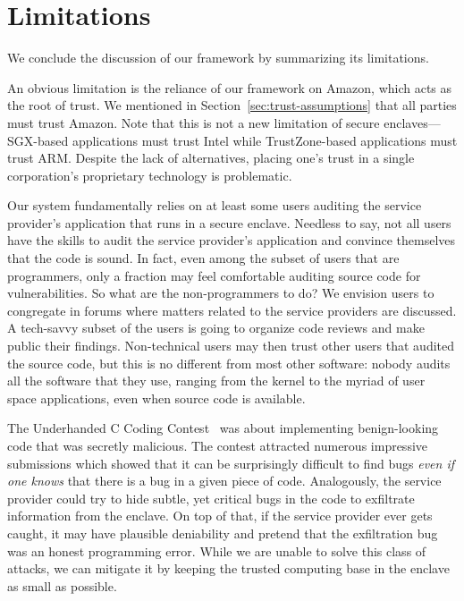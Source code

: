 \section{Limitations}
\label{sec:limitations}

We conclude the discussion of our framework by summarizing its limitations.

An obvious limitation is the reliance of our framework on Amazon, which acts as the root of trust.  We mentioned in Section~\ref{sec:trust-assumptions} that all parties must trust Amazon.  Note that this is not a new limitation of secure enclaves---SGX-based applications must trust Intel while TrustZone-based applications must trust ARM.  Despite the lack of alternatives, placing one's trust in a single corporation's proprietary technology is problematic.

Our system fundamentally relies on at least some users auditing the service provider's application that runs in a secure enclave.  Needless to say, not all users have the skills to audit the service provider's application and convince themselves that the code is sound.  In fact, even among the subset of users that are programmers, only a fraction may feel comfortable auditing source code for vulnerabilities.  So what are the non-programmers to do?  We envision users to congregate in forums where matters related to the service providers are discussed.  A tech-savvy subset of the users is going to organize code reviews and make public their findings.  Non-technical users may then trust other users that audited the source code, but this is no different from most other software: nobody audits all the software that they use, ranging from the kernel to the myriad of user space applications, even when source code is available.

The Underhanded C Coding Contest~\cite{underhanded-c} was about implementing benign-looking code that was secretly malicious.  The contest attracted numerous impressive submissions which showed that it can be surprisingly difficult to find bugs \emph{even if one knows} that there is a bug in a given piece of code.  Analogously, the service provider could try to hide subtle, yet critical bugs in the code to exfiltrate information from the enclave.  On top of that, if the service provider ever gets caught, it may have plausible deniability and pretend that the exfiltration bug was an honest programming error.  While we are unable to solve this class of attacks, we can mitigate it by keeping the trusted computing base in the enclave as small as possible.
